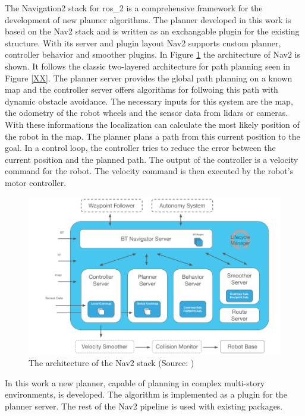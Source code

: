 The Navigation2 stack for \gls{ros_2} is a comprehensive framework for the development of new planner algorithms. The planner developed in this work is based on the Nav2 stack and is written as an exchangable plugin for the existing structure. With its server and plugin layout Nav2 supports custom planner, controller behavior and smoother plugins. In Figure \ref{fig:nav2_architecture} the architecture of Nav2 is shown. It follows the classic two-layered architecture for path planning seen in Figure \ref{XX}. The planner server provides the global path planning on a known map and the controller server offers algorithms for follwoing this path with dynamic obstacle avoidance. The necessary inputs for this system are the map, the odometry of the robot wheels and the sensor data from lidars or cameras. With these informations the localization can calculate the most likely position of the robot in the map. The planner plans a path from this current position to the goal. In a control loop, the controller tries to reduce the error between the current position and the planned path. The output of the controller is a velocity command for the robot. The velocity command is then executed by the robot's motor controller.

\begin{figure}[h]
    \centering
    \includegraphics[width=\textwidth]{figures/02_state_of_the_art/nav2_architecture.png}
    \caption{The architecture of the Nav2 stack (Source: \cite{https://navigation.ros.org/})}
    \label{fig:nav2_architecture}
\end{figure}

In this work a new planner, capable of planning in complex multi-story environments, is developed. The algorithm is implemented as a plugin for the planner server. The rest of the Nav2 pipeline is used with existing packages.

